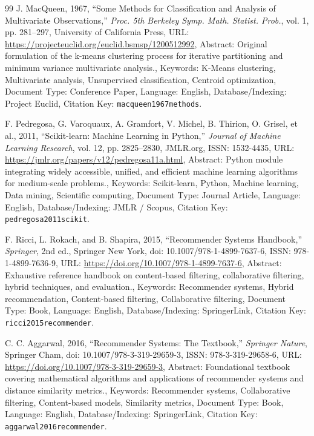 \documentclass[10pt,a4paper]{article}
\begin{document}
\begin{thebibliography}{99}
J. MacQueen, 1967, ``Some Methods for Classification and Analysis of Multivariate Observations,'' \textit{Proc. 5th Berkeley Symp. Math. Statist. Prob.}, vol. 1, pp. 281--297, University of California Press, URL: \url{https://projecteuclid.org/euclid.bsmsp/1200512992}, Abstract: Original formulation of the k-means clustering process for iterative partitioning and minimum variance multivariate analysis., Keywords: K-Means clustering, Multivariate analysis, Unsupervised classification, Centroid optimization, Document Type: Conference Paper, Language: English, Database/Indexing: Project Euclid, Citation Key: \texttt{macqueen1967methods}.

F. Pedregosa, G. Varoquaux, A. Gramfort, V. Michel, B. Thirion, O. Grisel, et al., 2011, ``Scikit-learn: Machine Learning in Python,'' \textit{Journal of Machine Learning Research}, vol. 12, pp. 2825--2830, JMLR.org, ISSN: 1532-4435, URL: \url{https://jmlr.org/papers/v12/pedregosa11a.html}, Abstract: Python module integrating widely accessible, unified, and efficient machine learning algorithms for medium-scale problems., Keywords: Scikit-learn, Python, Machine learning, Data mining, Scientific computing, Document Type: Journal Article, Language: English, Database/Indexing: JMLR / Scopus, Citation Key: \texttt{pedregosa2011scikit}.

F. Ricci, L. Rokach, and B. Shapira, 2015, ``Recommender Systems Handbook,'' \textit{Springer}, 2nd ed., Springer New York, doi: 10.1007/978-1-4899-7637-6, ISSN: 978-1-4899-7636-9, URL: \url{https://doi.org/10.1007/978-1-4899-7637-6}, Abstract: Exhaustive reference handbook on content-based filtering, collaborative filtering, hybrid techniques, and evaluation., Keywords: Recommender systems, Hybrid recommendation, Content-based filtering, Collaborative filtering, Document Type: Book, Language: English, Database/Indexing: SpringerLink, Citation Key: \texttt{ricci2015recommender}.

C. C. Aggarwal, 2016, ``Recommender Systems: The Textbook,'' \textit{Springer Nature}, Springer Cham, doi: 10.1007/978-3-319-29659-3, ISSN: 978-3-319-29658-6, URL: \url{https://doi.org/10.1007/978-3-319-29659-3}, Abstract: Foundational textbook covering mathematical algorithms and applications of recommender systems and distance similarity metrics., Keywords: Recommender systems, Collaborative filtering, Content-based models, Similarity metrics, Document Type: Book, Language: English, Database/Indexing: SpringerLink, Citation Key: \texttt{aggarwal2016recommender}.


\end{thebibliography}
\end{document}

